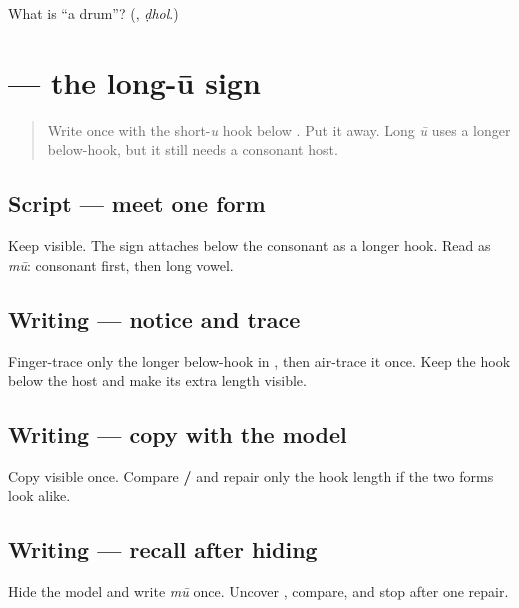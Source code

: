 \begin{tcolorbox}[breakable,colback=teal!4,colframe=teal!35!black,title={Before you move on}]
What is \textquotedblleft{}a drum\textquotedblright{}? (\textbf{}, \emph{ḍhol}.)
\end{tcolorbox}
\section[\texorpdfstring{\gu{ૂ} (ū)}{ૂ (ū)}]{ — the long-ū sign}

\label{lesson:GU-W07-uu-matra}



\begin{quote}
Write \textbf{} once with the short-\emph{u} hook below \textbf{}. Put it away. Long \emph{ū} uses a longer below-hook, but it still needs a consonant host.
\end{quote}

\subsection*{Script — meet one form}
Keep \textbf{} visible. The sign \textbf{} attaches below the consonant as a longer hook. Read \textbf{} as \emph{mū}: consonant first, then long vowel.

\subsection*{Writing — notice and trace}

Finger-trace only the longer below-hook in \textbf{}, then air-trace it once. Keep the hook below the host and make its extra length visible.

\subsection*{Writing — copy with the model}
Copy visible \textbf{} once. Compare \textbf{ / } and repair only the hook length if the two forms look alike.

\subsection*{Writing — recall after hiding}
Hide the model and write \emph{mū} once. Uncover \textbf{}, compare, and stop after one repair.

